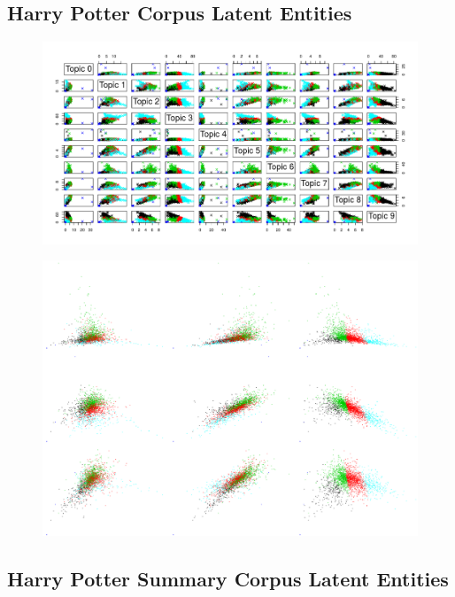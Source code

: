 \documentclass[10pt]{report}
\begin{document}
\clearpage
\subsection{Harry Potter Corpus Latent Entities}
\begin{figure}[h!]
  \centering
  \includegraphics[scale=0.55]{hp_le_clusters}
\caption{\label{fig:hp_le_clusters}}
\end{figure}


\begin{figure}[h!]
  \centering
  \includegraphics[scale=0.14]{hp_le_cluster_zoom}
\caption{\label{fig:hp_le_cluster_zoom}}
\end{figure}



\clearpage
\subsection{Harry Potter Summary Corpus Latent Entities}
\end{document}
